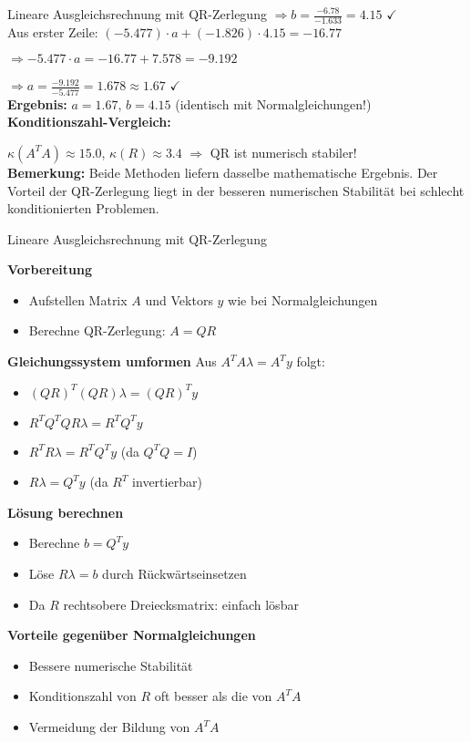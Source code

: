 \begin{example2}{Lineare Ausgleichsrechnung mit QR-Zerlegung}
$\Rightarrow b = \frac{-6.78}{-1.633} = 4.15$ $\checkmark$
\vspace{1mm}\\
Aus erster Zeile: $(-5.477) \cdot a + (-1.826) \cdot 4.15 = -16.77$

$\Rightarrow -5.477 \cdot a = -16.77 + 7.578 = -9.192$

$\Rightarrow a = \frac{-9.192}{-5.477} = 1.678 \approx 1.67$ $\checkmark$
\vspace{1mm}\\
\textbf{Ergebnis:} $a = 1.67$, $b = 4.15$ (identisch mit Normalgleichungen!)
\vspace{1mm}\\
\textbf{Konditionszahl-Vergleich:}

$\kappa(A^T A) \approx 15.0$, $\kappa(R) \approx 3.4$ $\Rightarrow$ QR ist numerisch stabiler!
\vspace{1mm}\\
\textbf{Bemerkung:} Beide Methoden liefern dasselbe mathematische Ergebnis. Der Vorteil der QR-Zerlegung liegt in der besseren numerischen Stabilität bei schlecht konditionierten Problemen.
\end{example2}


\begin{KR}{Lineare Ausgleichsrechnung mit QR-Zerlegung}

\textbf{Vorbereitung}
\begin{itemize}
    \item Aufstellen Matrix $A$ und Vektors $y$ wie bei Normalgleichungen
    \item Berechne QR-Zerlegung: $A = QR$
\end{itemize}

\textbf{Gleichungssystem umformen}
Aus $A^T A \lambda = A^T y$ folgt:
\begin{itemize}
    \item $(QR)^T (QR) \lambda = (QR)^T y$
    \item $R^T Q^T Q R \lambda = R^T Q^T y$
    \item $R^T R \lambda = R^T Q^T y$ (da $Q^T Q = I$)
    \item $R \lambda = Q^T y$ (da $R^T$ invertierbar)
\end{itemize}

\textbf{Lösung berechnen}
\begin{itemize}
    \item Berechne $b = Q^T y$
    \item Löse $R \lambda = b$ durch Rückwärtseinsetzen
    \item Da $R$ rechtsobere Dreiecksmatrix: einfach lösbar
\end{itemize}

\textbf{Vorteile gegenüber Normalgleichungen}
\begin{itemize}
    \item Bessere numerische Stabilität
    \item Konditionszahl von $R$ oft besser als die von $A^T A$
    \item Vermeidung der Bildung von $A^T A$
\end{itemize}
\end{KR}

